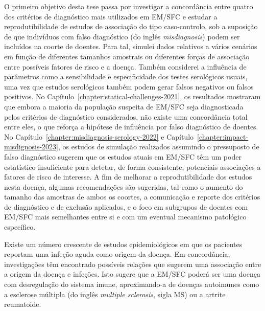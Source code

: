 O primeiro objetivo desta tese passa por investigar a concordância entre quatro dos critérios de diagnóstico mais utilizados em EM/SFC e estudar a reprodutibilidade de estudos de associação do tipo caso-controlo, sob a suposição de que indivíduos com falso diagnóstico (do inglês \textit{misdiagnosis}) podem ser incluídos na coorte de doentes. Para tal, simulei dados relativos a vários cenários em função de diferentes tamanhos amostrais ou diferentes forças de associação entre possíveis fatores de risco e a doença. Também considerei a influência de parâmetros como a sensibilidade e especificidade dos testes serológicos usuais, uma vez que estudos serológicos também podem gerar falsos negativos ou falsos positivos. No Capítulo~\ref{chapter:statical-challenges-2021}, os resultados mostraram que embora a maioria da população suspeita de EM/SFC seja diagnosticada pelos critérios de diagnóstico considerados, não existe uma concordância total entre eles, o que reforça a hipótese de influência por falso diagnóstico de doentes. No Capítulo~\ref{chapter:misdiagnosis-serology-2022} e Capítulo~\ref{chapter:impact-misdignosis-2023}, os estudos de simulação realizados assumindo o pressuposto de falso diagnóstico sugerem que os estudos atuais em EM/SFC têm um poder estatístico insuficiente para detetar, de forma consistente, potenciais associações a fatores de risco de interesse. A fim de melhorar a reprodutibilidade dos estudos nesta doença, algumas recomendações são sugeridas, tal como o aumento do tamanho das amostras de ambos os coortes, a comunicação e reporte dos critérios de diagnóstico e de exclusão aplicados, e o foco em subgrupos de doentes com EM/SFC mais semelhantes entre si e com um eventual mecanismo patológico específico.

Existe um número crescente de estudos epidemiológicos em que os pacientes reportam uma infeção aguda como origem da doença. Em concordância, investigações têm encontrado possíveis relações que sugerem uma associação entre a origem da doença e infeções. Isto sugere que a EM/SFC poderá ser uma doença com desregulação do sistema imune, aproximando-a de doenças autoimunes como a esclerose múltipla (do inglês \textit{multiple sclerosis}, sigla MS) ou a artrite reumatoide.

